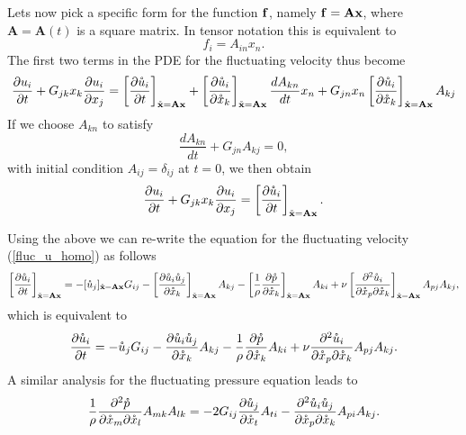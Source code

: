 \documentclass[oneside,a4paper,11pt]{report}
\newcommand{\uifluc}{u_i}
\begin{document}
Lets now pick a specific form for the function $\mathbf{f}$, namely $\mathbf{f} = \mathbf{A}\mathbf{x}$, where $\mathbf{A} = \mathbf{A}(t)$ is a square matrix. In tensor notation this is equivalent to
\begin{equation}
f_i = A_{in} x_n.
\end{equation}
The first two terms in the PDE for the fluctuating velocity thus become
\begin{equation}
\frac{\partial \uifluc}{\partial t} + G_{jk}x_k\frac{\partial u_i }{\partial x_j} = \left [ \frac{\partial \urog_i }{\partial t } \right ]_{\xrogvec = \mathbf{A}\xvec} + \left [ \frac{\partial \urog_i }{\partial \xrog_k}\right ]_{\xrogvec = \mathbf{A} \xvec} \frac{d A_{kn} }{d t} x_n + G_{jn}x_n \left [ \frac{\partial \urog_i }{\partial \xrog_k} \right ]_{\xrogvec = \mathbf{A} \xvec} A_{kj}
\end{equation}
If we choose $A_{kn}$ to satisfy
\begin{equation}
\label{rogallo_trans}
\frac{d A_{kn}}{dt} + G_{jn}A_{kj} = 0,
\end{equation}
with initial condition $A_{ij} = \delta_{ij}$ at $t = 0$, we then obtain 
\begin{equation}
\frac{\partial \uifluc }{\partial t} + G_{jk}x_k\frac{\partial u_i}{\partial x_j} = \left [ \frac{\partial \urog_i }{\partial t } \right ]_{\xrogvec = \mathbf{A} \xvec}.
\end{equation}

Using the above we can re-write the equation for the fluctuating velocity (\ref{fluc_u_homo}) as follows
\begin{equation}
\left [ \frac{\partial \mathring{u}_i }{\partial t } \right ]_{\mathring{\mathbf{x}} = \mathbf{A} \mathbf{x}} = -[\mathring{u}_j]_{\mathring{\mathbf{x}} = \mathbf{A} \mathbf{x}} G_{ij} - \left [ \frac{\partial \mathring{u}_i \mathring{u}_j}{\partial \mathring{x}_k} \right ]_{\mathring{\mathbf{x}} = \mathbf{A}\mathbf{x}} A_{kj} - \left [ \frac{1}{\rho} \frac{\partial \mathring{p} }{\partial \mathring{x}_k} \right ]_{\mathring{\mathbf{x}} = \mathbf{A}\mathbf{x} } A_{ki} + \nu \left [ \frac{ \partial^2 \mathring{u}_i}{\partial \mathring{x}_p \partial \mathring{x}_k} \right ]_{\mathring{\mathbf{x}} = \mathbf{A} \mathbf{x}} A_{pj} A_{kj},
\end{equation}
which is equivalent to
\begin{equation}
\label{eq:u_lin_tran}
\frac{\partial \mathring{u}_i }{\partial t } = -\mathring{u}_j G_{ij} - \frac{\partial \mathring{u}_i \mathring{u}_j}{\partial \mathring{x}_k} A_{kj} - \frac{1}{\rho} \frac{\partial \mathring{p} }{\partial \mathring{x}_k} A_{ki} + \nu \frac{ \partial^2 \mathring{u}_i}{\partial \mathring{x}_p \partial \mathring{x}_k} A_{pj} A_{kj}.
\end{equation}
A similar analysis for the fluctuating pressure equation leads to
\begin{equation}
\label{p_lin_tran}
\frac{1}{\rho} \frac{\partial^2 \mathring{p} }{\partial \mathring{x}_m \partial \mathring{x}_l} A_{mk} A_{lk} = -2 G_{ij} \frac{\partial \mathring{u}_j }{\partial \mathring{x}_t} A_{ti} - \frac{\partial^2 \mathring{u}_i \mathring{u}_j}{\partial \mathring{x}_p \partial \mathring{x}_k} A_{pi}A_{kj}.
\end{equation}
\end{document}
